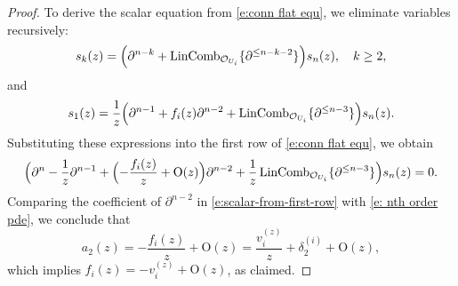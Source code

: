 \documentclass[twoside, 11pt]{article}
\numberwithin{equation}{section}
\theoremstyle{theorem}
\numberwithin{theorem}{section}
\theoremstyle{definition}
\begin{document}
\begin{proof}
To derive the scalar equation from \eqref{e:conn flat equ}, we eliminate variables recursively:
\[
s_k(z)
=\Bigl(\partial^{n-k}
+\mathrm{LinComb}_{\mathcal O_{U_i}}\{\partial^{\le n-k-2}\}\Bigr)s_n(z),
\quad k\ge2,
\]
and
\[
s_1(z)
=\frac{1}{z}\Bigl(
\partial^{n-1}
+f_i(z)\partial^{n-2}
+\mathrm{LinComb}_{\mathcal O_{U_i}}\{\partial^{\le n-3}\}
\Bigr)s_n(z).
\]
Substituting these expressions into the first row of
\eqref{e:conn flat equ}, we obtain
\begin{align}\label{e:scalar-from-first-row}
\Bigl(
\partial^{n}
-\frac{1}{z}\partial^{n-1}
+\Bigl(
-\frac{f_i(z)}{z}
+\mathrm{O}(z)
\Bigr)\partial^{n-2}
+\frac{1}{z}\,
\mathrm{LinComb}_{\mathcal O_{U_i}}\{\partial^{\le n-3}\}
\Bigr)s_n(z)=0.
\end{align}
Comparing the coefficient of $\partial^{n-2}$ in
\eqref{e:scalar-from-first-row} with \eqref{e: nth order pde}, we conclude that
\[
a_2(z)
=-\frac{f_i(z)}{z}+\mathrm{O}(z)
=\frac{v_i^{(z)}}{z}+\delta_2^{(i)}+\mathrm{O}(z),
\]
which implies
\(
f_i(z)=-v_i^{(z)}+\mathrm{O}(z)
\),
as claimed.
\end{proof}
\end{document}
